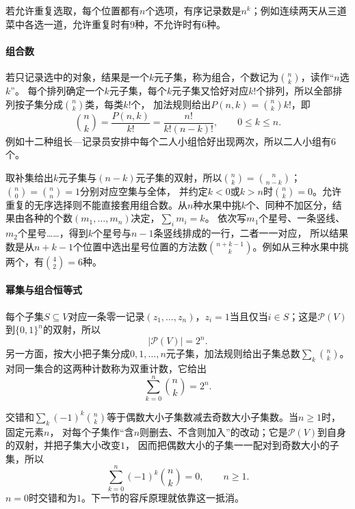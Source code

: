 若允许重复选取，每个位置都有$n$个选项，有序记录数是$n^k$；例如连续两天从三道菜中各选一道，允许重复时有$9$种，不允许时有$6$种。

\paragraph{组合数}
若只记录选中的对象，结果是一个$k$元子集，称为组合，个数记为$\binom nk$，读作“$n$选$k$”。
每个排列确定一个$k$元子集，每个$k$元子集又恰好对应$k!$个排列，所以全部排列按子集分成$\binom nk$类，每类$k!$个，
加法规则给出$P(n,k)=\binom nk k!$，即
\begin{equation}
 \binom nk=\frac{P(n,k)}{k!}=\frac{n!}{k!(n-k)!},\qquad 0\leq k\leq n.
 \label{eq:prelim-binomial-coefficient}
\end{equation}
例如十二种组长—记录员安排中每个二人小组恰好出现两次，所以二人小组有$6$个。

取补集给出$k$元子集与$(n-k)$元子集的双射，所以$\binom nk=\binom n{n-k}$；$\binom n0=\binom nn=1$分别对应空集与全体，
并约定$k<0$或$k>n$时$\binom nk=0$。允许重复的无序选择则不能直接套用组合数。从$n$种水果中挑$k$个、同种不加区分，结果由各种的个数$(m_1,\ldots,m_n)$决定，$\sum_im_i=k$。
依次写$m_1$个星号、一条竖线、$m_2$个星号……，得到$k$个星号与$n-1$条竖线排成的一行，二者一一对应，
所以结果数是从$n+k-1$个位置中选出星号位置的方法数$\binom{n+k-1}{k}$。例如从三种水果中挑两个，有$\binom42=6$种。

\paragraph{幂集与组合恒等式}
\label{sec:comb-ordered-unordered}
每个子集$S\subseteq V$对应一条零一记录$(z_1,\ldots,z_n)$，$z_i=1$当且仅当$i\in S$；这是$\mathcal P(V)$到$\{0,1\}^n$的双射，所以
\begin{equation}
 |\mathcal P(V)|=2^n.
 \label{eq:comb-power-set-count}
\end{equation}
另一方面，按大小把子集分成$0,1,\ldots,n$元子集，加法规则给出子集总数$\sum_k\binom nk$。对同一集合的这两种计数称为双重计数，它给出
\[
 \sum_{k=0}^n\binom nk=2^n.
\]

交错和$\sum_k(-1)^k\binom nk$等于偶数大小子集数减去奇数大小子集数。当$n\geq1$时，固定元素$n$，
对每个子集作“含$n$则删去、不含则加入”的改动；它是$\mathcal P(V)$到自身的双射，并把子集大小改变$1$，
因而把偶数大小的子集一一配对到奇数大小的子集，所以
\begin{equation}
 \sum_{k=0}^n(-1)^k\binom nk=0,\qquad n\geq1.
 \label{eq:comb-alternating-subset-count}
\end{equation}
$n=0$时交错和为$1$。下一节的容斥原理就依靠这一抵消。

